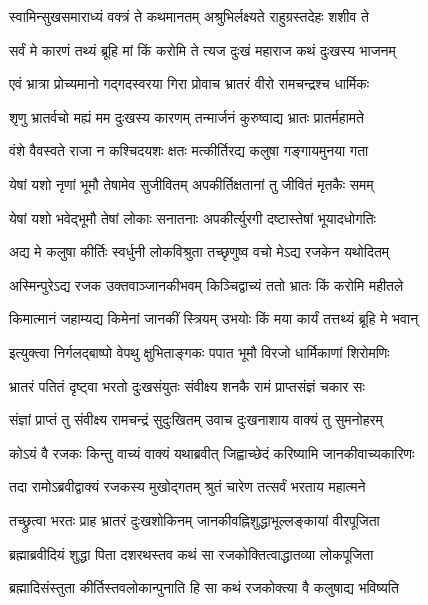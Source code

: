 \twolineshloka
{स्वामिन्सुखसमाराध्यं वक्त्रं ते कथमानतम्}
{अश्रुभिर्लक्ष्यते राहुग्रस्तदेहः शशीव ते}%

\twolineshloka
{सर्वं मे कारणं तथ्यं ब्रूहि मां किं करोमि ते}
{त्यज दुःखं महाराज कथं दुःखस्य भाजनम्}%

\twolineshloka
{एवं भ्रात्रा प्रोच्यमानो गद्गदस्वरया गिरा}
{प्रोवाच भ्रातरं वीरो रामचन्द्रश्च धार्मिकः}%

\twolineshloka
{शृणु भ्रातर्वचो मह्यं मम दुःखस्य कारणम्}
{तन्मार्जनं कुरुष्वाद्य भ्रातः प्रातर्महामते}%

\twolineshloka
{वंशे वैवस्वते राजा न कश्चिदयशः क्षतः}
{मत्कीर्तिरद्य कलुषा गङ्गायमुनया गता}%

\twolineshloka
{येषां यशो नृणां भूमौ तेषामेव सुजीवितम्}
{अपकीर्तिक्षतानां तु जीवितं मृतकैः समम्}%

\twolineshloka
{येषां यशो भवेद्भूमौ तेषां लोकाः सनातनाः}
{अपकीर्त्युरगी दष्टास्तेषां भूयादधोगतिः}%

\twolineshloka
{अद्य मे कलुषा कीर्तिः स्वर्धुनी लोकविश्रुता}
{तच्छृणुष्व वचो मेऽद्य रजकेन यथोदितम्}%

\twolineshloka
{अस्मिन्पुरेऽद्य रजक उक्तवाञ्जानकीभवम्}
{किञ्चिद्वाच्यं ततो भ्रातः किं करोमि महीतले}%

\twolineshloka
{किमात्मानं जहाम्यद्य किमेनां जानकीं स्त्रियम्}
{उभयोः किं मया कार्यं तत्तथ्यं ब्रूहि मे भवान्}%

\twolineshloka
{इत्युक्त्वा निर्गलद्बाष्पो वेपथु क्षुभिताङ्गकः}
{पपात भूमौ विरजो धार्मिकाणां शिरोमणिः}%

\twolineshloka
{भ्रातरं पतितं दृष्ट्वा भरतो दुःखसंयुतः}
{संवीक्ष्य शनकै रामं प्राप्तसंज्ञं चकार सः}%

\twolineshloka
{संज्ञां प्राप्तं तु संवीक्ष्य रामचन्द्रं सुदुःखितम्}
{उवाच दुःखनाशाय वाक्यं तु सुमनोहरम्}%

\twolineshloka
{कोऽयं वै रजकः किन्तु वाच्यं वाक्यं यथाब्रवीत्}
{जिह्वाच्छेदं करिष्यामि जानकीवाच्यकारिणः}%

\twolineshloka
{तदा रामोऽब्रवीद्वाक्यं रजकस्य मुखोद्गतम्}
{श्रुतं चारेण तत्सर्वं भरताय महात्मने}%

\twolineshloka
{तच्छ्रुत्वा भरतः प्राह भ्रातरं दुःखशोकिनम्}
{जानकीवह्निशुद्धाभूल्लङ्कायां वीरपूजिता}%

\twolineshloka
{ब्रह्माब्रवीदियं शुद्धा पिता दशरथस्तव}
{कथं सा रजकोक्तित्वाद्धातव्या लोकपूजिता}%

\twolineshloka
{ब्रह्मादिसंस्तुता कीर्तिस्तवलोकान्पुनाति हि}
{सा कथं रजकोक्त्या वै कलुषाद्य भविष्यति}%

